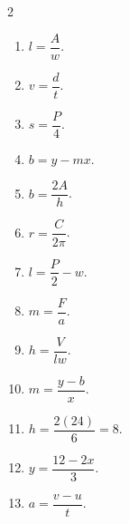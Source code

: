 \documentclass[11pt]{article}
\begin{document}
\begin{keybox}
\begin{multicols}{2}
\small
\begin{enumerate}[leftmargin=*,itemsep=3pt]
  \item $l=\dfrac{A}{w}$.
  \item $v=\dfrac{d}{t}$.
  \item $s=\dfrac{P}{4}$.
  \item $b=y-mx$.
  \item $b=\dfrac{2A}{h}$.
  \item $r=\dfrac{C}{2\pi}$.
  \item $l=\dfrac{P}{2}-w$.
  \item $m=\dfrac{F}{a}$.
  \item $h=\dfrac{V}{lw}$.
  \item $m=\dfrac{y-b}{x}$.
  \item $h=\dfrac{2(24)}{6}=8$.
  \item $y=\dfrac{12-2x}{3}$.
  \item $a=\dfrac{v-u}{t}$.
\end{enumerate}
\end{multicols}
\end{keybox}
\end{document}

